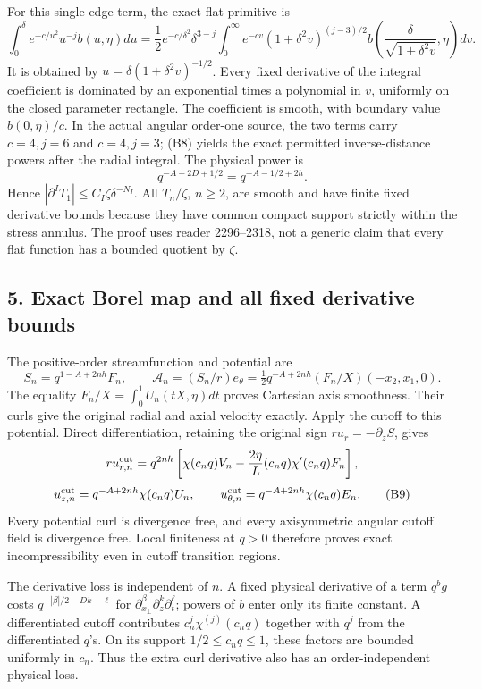 \documentclass[10pt,a4paper]{article}
\begin{document}
For this single edge term, the exact flat primitive is \[
\int_0^\delta e^{-c/u^2}u^{-j}b(u,\eta)du
=\frac12e^{-c/\delta^2}\delta^{3-j}
\int_0^\infty e^{-cv}(1+\delta^2v)^{(j-3)/2}
b\left(\frac\delta{\sqrt{1+\delta^2v}},\eta\right)dv.
\tag{B8}
\] It is obtained by \(u=\delta(1+\delta^2v)^{-1/2}\). Every fixed derivative of the integral coefficient is dominated by an exponential times a polynomial in \(v\), uniformly on the closed parameter rectangle. The coefficient is smooth, with boundary value \(b(0,\eta)/c\). In the actual angular order-one source, the two terms carry \(c=4,j=6\) and \(c=4,j=3\); (B8) yields the exact permitted inverse-distance powers after the radial integral. The physical power is \[
q^{-A-2D+1/2}=q^{-A-1/2+2h}.
\] Hence \(|\partial^IT_1|\le C_I\zeta\delta^{-N_I}\). All \(T_n/\zeta\), \(n\ge2\), are smooth and have finite fixed derivative bounds because they have common compact support strictly within the stress annulus. The proof uses reader 2296--2318, not a generic claim that every flat function has a bounded quotient by \(\zeta\).

\subsection{5. Exact Borel map and all fixed derivative bounds}\label{gclosure:exact-borel-map-and-all-fixed-derivative-bounds}

The positive-order streamfunction and potential are \[
S_n=q^{1-A+2nh}F_n,
\qquad
\mathcal A_n=(S_n/r)e_\theta
=\tfrac12q^{-A+2nh}(F_n/X)(-x_2,x_1,0).
\] The equality \(F_n/X=\int_0^1U_n(tX,\eta)dt\) proves Cartesian axis smoothness. Their curls give the original radial and axial velocity exactly. Apply the cutoff to this potential. Direct differentiation, retaining the original sign \(ru_r=-\partial_zS\), gives \[
ru_{r,n}^{\rm cut}=q^{2nh}
\left[\chi(c_nq)V_n-\frac{2\eta}{L}(c_nq)\chi'(c_nq)F_n\right],
\] \[
u_{z,n}^{\rm cut}=q^{-A+2nh}\chi(c_nq)U_n,
\qquad
u_{\theta,n}^{\rm cut}=q^{-A+2nh}\chi(c_nq)E_n.
\tag{B9}
\] Every potential curl is divergence free, and every axisymmetric angular cutoff field is divergence free. Local finiteness at \(q>0\) therefore proves exact incompressibility even in cutoff transition regions.

The derivative loss is independent of \(n\). A fixed physical derivative of a term \(q^bg\) costs \(q^{-|\beta|/2-Dk-\ell}\) for \(\partial_{x_\perp}^{\beta}\partial_z^k\partial_t^\ell\); powers of \(b\) enter only its finite constant. A differentiated cutoff contributes \(c_n^j\chi^{(j)}(c_nq)\) together with \(q^j\) from the differentiated \(q\)'s. On its support \(1/2\le c_nq\le1\), these factors are bounded uniformly in \(c_n\). Thus the extra curl derivative also has an order-independent physical loss.
\end{document}
